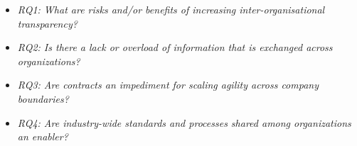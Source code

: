 %

\begin{itemize}
\item {\em RQ1: What are  risks and/or benefits of increasing inter-organisational transparency?}
\item {\em RQ2: Is there a lack or overload of information that is exchanged across organizations?} 
\item {\em RQ3: Are contracts an impediment for scaling agility across company boundaries?} %
\item {\em RQ4: Are industry-wide standards and processes shared among organizations an enabler?}
\end{itemize}


